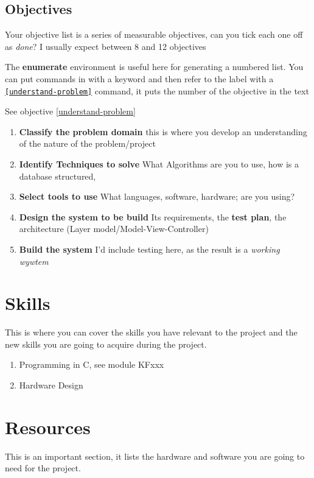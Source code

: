 \subsection{Objectives}
Your objective list is a series of measurable objectives, can you tick each one off as \emph{done}?  I usually expect between 8 and 12 objectives

The \textbf{enumerate} environment is useful here for generating a numbered list.   You can put \texttt{\label{}} commands in with a keyword \texttt{\label{understand-problem}} and then refer to the label with a \texttt{\ref{understand-problem}} command, it puts the number of the objective in the text
\begin{tcblisting}{ }
	See objective \ref{understand-problem}
\end{tcblisting}
\begin{enumerate}
	\item \textbf{Classify the problem domain}\label{understand-problem}  this is where you develop an understanding of the nature of the problem/project
	\item \textbf{Identify Techniques to solve}  What Algorithms are you to use, how is a database structured,
	\item \textbf{Select tools to use}  What languages, software, hardware; are you using?
	\item \textbf{Design the system to be build}\label{write-code}  Its requirements, the \textbf{test plan}, the architecture (Layer model/Model-View-Controller)
	\item \textbf{Build the system}  I'd include testing here, as the result is a \emph{working wywtem}
\end{enumerate}

\section{Skills}
This is where you can cover the skills you have relevant to the project and the new skills you are going to acquire during the project.
\begin{enumerate}
	\item Programming in C, see module KFxxx
	\item Hardware Design
\end{enumerate}

\section{Resources}
This is an important section, it lists the hardware and software you are going to need for the project.

